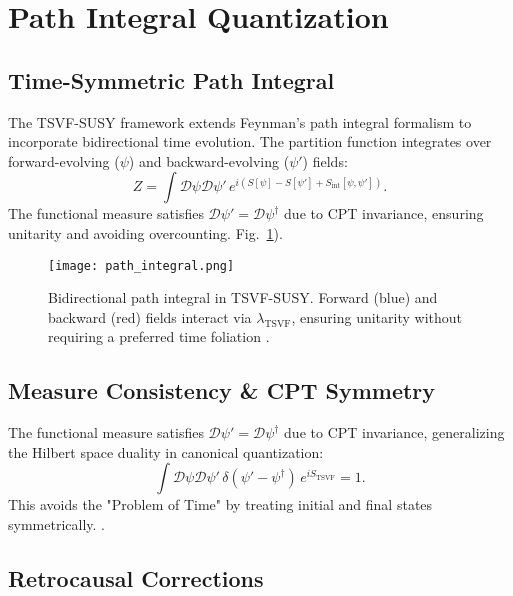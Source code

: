 \documentclass[twocolumn,superscriptaddress,floatfix]{revtex4-2}
\begin{document}
\section{Path Integral Quantization}  
\label{sec:path_integral}  

\subsection{Time-Symmetric Path Integral}
The TSVF-SUSY framework extends Feynman's path integral formalism to incorporate bidirectional time evolution. The partition function integrates over forward-evolving ($\psi$) and backward-evolving ($\psi'$) fields:
\begin{equation}
Z = \int \mathcal{D}\psi \mathcal{D}\psi' \, e^{i(S[\psi] - S[\psi'] + S_{\text{int}}[\psi, \psi'])}.
\end{equation}
The functional measure satisfies $\mathcal{D}\psi' = \mathcal{D}\psi^{\dagger}$ due to CPT invariance, ensuring unitarity and avoiding overcounting. Fig.~\ref{fig:path_integral}).  

\begin{figure}[htbp]  
\centering  
\texttt{[image: path\_integral.png]}  
\caption{Bidirectional path integral in TSVF-SUSY. Forward (blue) and backward (red) fields interact via \(\lambda_{\text{TSVF}}\), ensuring unitarity without requiring a preferred time foliation \cite{Isham1992}.}  
\label{fig:path_integral}  
\end{figure}  

\subsection{Measure Consistency \& CPT Symmetry}  
\label{subsec:measure}  

The functional measure satisfies $\mathcal{D}\psi' = \mathcal{D}\psi^{\dagger}$ due to CPT invariance, generalizing the Hilbert space duality in canonical quantization:
\begin{equation}
\int \mathcal{D}\psi \mathcal{D}\psi' \, \delta(\psi' - \psi^{\dagger}) \, e^{iS_{\text{TSVF}}} = 1.
\end{equation}
This avoids the "Problem of Time" by treating initial and final states symmetrically. \cite{DeWitt1967}.  

\subsection{Retrocausal Corrections}  
\label{subsec:retrocausal}  
\end{document}

